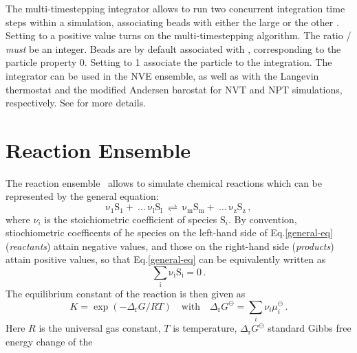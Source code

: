 The multi-timestepping integrator allows to run two concurrent integration time
steps within a simulation, associating beads with either the large
 or the other .  Setting
 to a positive value turns on the multi-timestepping
algorithm.  The ratio / \emph{must} be
an integer.  Beads are by default associated with ,
corresponding to the particle property  0.  Setting
 to 1 associate the particle to the
 integration.  The integrator can be used in the NVE
ensemble, as well as with the Langevin thermostat and the modified Andersen
barostat for NVT and NPT simulations, respectively.  See \cite{bereau15} for
more details.

\section{Reaction Ensemble}
The reaction ensemble~\cite{smith94a} allows to simulate chemical reactions which can be represented by the general equation:
\begin{equation}
	\mathrm{\nu_1 S_1 +\ \dots\  \nu_l S_l\ \rightleftharpoons\ \nu_m S_m +\ \dots\ \nu_z S_z } \,,
	\label{general-eq}
\end{equation}
where $\nu_i$ is the stoichiometric coefficient of species $\mathrm{S}_i$.  By
convention, stiochiometric coefficents of he species on the left-hand side of
Eq.\ref{general-eq} (\emph{reactants}) attain negative values, and those on the
right-hand side (\emph{products}) attain positive values, so that
Eq.\ref{general-eq} can be equivalently written as
\begin{equation}
	\mathrm{\sum_i \nu_i S_i = 0} \,.
	\label{general-eq-sum}
\end{equation}
The equilibrium constant of the reaction is then given as
\begin{equation}
	K = \exp(-\Delta_{\mathrm{r}}G / RT)
	\quad\text{with}\quad
	\Delta_{\mathrm{r}}G^{\ominus} = \sum_i \nu_i \mu_i^{\ominus}\,.
	\label{Keq}
\end{equation}
Here $R$ is the universal gas constant, $T$ is temperature,
$\Delta_{\mathrm{r}}G^{\ominus}$ standard Gibbs free energy change of the
